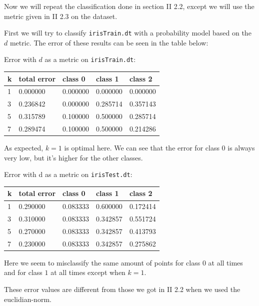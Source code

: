 \documentclass[a4paper,10pt]{article}
\begin{document}
Now we will repeat the classification done in section II 2.2, except we will
use the metric given in II 2.3 on the dataset.

First we will try to classify \verb=irisTrain.dt= with a probability model based on the $d$ metric. The error of these results can be seen in the table below:

Error with $d$ as a metric on \verb=irisTrain.dt=:
\begin{center}
\begin{tabular}{l|llll}
 k & total error & class 0 & class 1 & class 2\\ \hline
 1 & 0.000000 & 0.000000 & 0.000000 & 0.000000\\
 3 & 0.236842 & 0.000000 & 0.285714 & 0.357143\\
 5 & 0.315789 & 0.100000 & 0.500000 & 0.285714\\
 7 & 0.289474 & 0.100000 & 0.500000 & 0.214286\\
\end{tabular}
\end{center}

As expected, $k=1$ is optimal here. We can see that the error for class $0$ is always very low, but it's higher for the other classes.

Error with d as a metric on \verb=irisTest.dt=:
\begin{center}
\begin{tabular}{l|llll}
 k & total error & class 0 & class 1 & class 2\\ \hline
 1 & 0.290000 & 0.083333 & 0.600000 & 0.172414\\
 3 & 0.310000 & 0.083333 & 0.342857 & 0.551724\\
 5 & 0.270000 & 0.083333 & 0.342857 & 0.413793\\
 7 & 0.230000 & 0.083333 & 0.342857 & 0.275862\\
\end{tabular}
\end{center}

Here we seem to misclassify the same amount of points for class $0$ at all times and for class $1$ at all times except when $k=1$.

These error values are different from those we got in II 2.2 when we
used the euclidian-norm.
\end{document}
